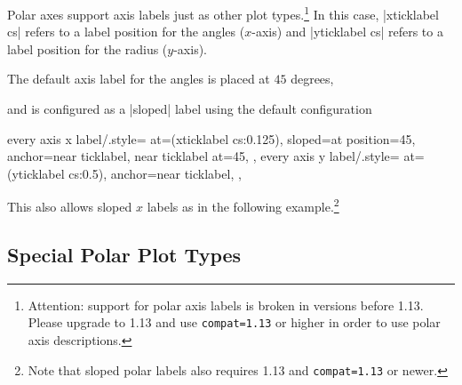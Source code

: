 {Polar axes support axis labels just as other plot types.\footnote{Attention:
support for polar axis labels is broken in versions before 1.13. Please upgrade
to \PGFPlots{} 1.13 and use \texttt{compat=1.13} or higher in order to use
polar axis descriptions.} In this case, |xticklabel cs| refers to a label
position for the angles ($x$-axis) and |yticklabel cs| refers to a label
position for the radius ($y$-axis).

The default axis label for the angles is placed at $45$ degrees,
%
\begin{codeexample}[]
\end{codeexample}
%
and is configured as a |sloped| label using the
default configuration
%
\begin{codeexample}
    every axis x label/.style={
        at={(xticklabel cs:0.125)},
        sloped={at position=45},
        anchor=near ticklabel,
        near ticklabel at=45,
    },
    every axis y label/.style={
        at={(yticklabel cs:0.5)},
        anchor=near ticklabel,
    },
\end{codeexample}

This also allows sloped $x$ labels as in the following example.\footnote{Note
that sloped polar labels also requires \PGFPlots{} 1.13 and
\texttt{compat=1.13} or newer.}
%
\begin{codeexample}[]
\end{codeexample}


\subsection{Special Polar Plot Types}

}

